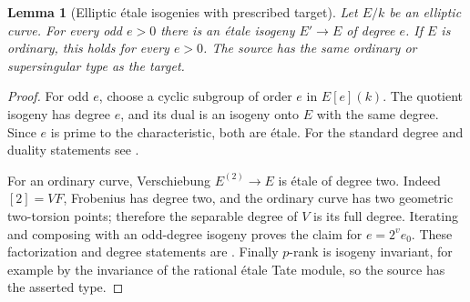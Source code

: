 \documentclass[11pt]{article}
\newtheorem{lemma}[theorem]{Lemma}
\theoremstyle{definition}\newtheorem{definition}[theorem]{Definition}
\theoremstyle{remark}\newtheorem{remark}[theorem]{Remark}
\begin{document}
\begin{lemma}[Elliptic \'etale isogenies with prescribed target]\label{lem:isogeny}
Let $E/k$ be an elliptic curve. For every odd $e>0$ there is an \'etale isogeny $E'\to E$ of degree $e$. If $E$ is ordinary, this holds for every $e>0$. The source has the same ordinary or supersingular type as the target.
\end{lemma}
\begin{proof}
For odd $e$, choose a cyclic subgroup of order $e$ in $E[e](k)$. The quotient isogeny has degree $e$, and its dual is an isogeny onto $E$ with the same degree. Since $e$ is prime to the characteristic, both are \'etale. For the standard degree and duality statements see \citet[Theorem~7.5 and Corollary~7.17, pp.~100, 104]{EGM}.

For an ordinary curve, Verschiebung $E^{(2)}\to E$ is \'etale of degree two. Indeed $[2]=VF$, Frobenius has degree two, and the ordinary curve has two geometric two-torsion points; therefore the separable degree of $V$ is its full degree. Iterating and composing with an odd-degree isogeny proves the claim for $e=2^ve_0$. These factorization and degree statements are \citet[Propositions~5.20--5.22, pp.~80--81]{EGM}. Finally $p$-rank is isogeny invariant, for example by the invariance of the rational \'etale Tate module, so the source has the asserted type.
\end{proof}
\end{document}
